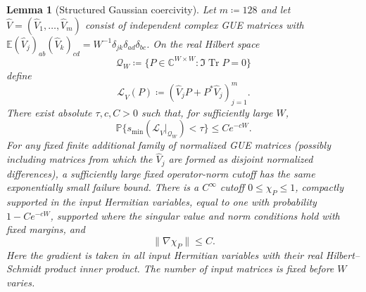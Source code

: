 \documentclass[11pt]{article}
\numberwithin{equation}{section}
\newtheorem{lemma}[theorem]{Lemma}
\theoremstyle{remark}
\newcommand{\E}{\mathbb E}
\newcommand{\Prob}{\mathbb P}
\newcommand{\Tr}{\operatorname{Tr}}
\begin{document}
\begin{lemma}[Structured Gaussian coercivity]\label{lem:c-gaussian}
Let \(m\coloneqq 128\) and let \(\widehat V=(\widehat V_1,\ldots,\widehat V_m)\) consist of independent complex GUE
matrices with
\(\E(\widehat V_j)_{ab}(\widehat V_k)_{cd}
  =W^{-1}\delta_{jk}\delta_{ad}\delta_{bc}\).
On the real Hilbert space
\[
 \mathcal Q_W\coloneqq \{P\in\mathbb C^{W\times W}:\Im\Tr P=0\}
\]
define
\begin{equation}
 \mathcal L_{\widehat V}(P)\coloneqq (\widehat V_jP+P^*\widehat V_j)_{j=1}^{m}.
 \label{cg:eq:LG}
\end{equation}
There exist absolute \(\tau,c,C>0\) such that, for sufficiently large \(W\),
\begin{equation}
 \Prob\{s_{\min}(\mathcal L_{\widehat V}|_{\mathcal Q_W})<\tau\}\le Ce^{-cW}.
 \label{cg:eq:SG}
\end{equation}
For any fixed finite additional family of normalized GUE matrices
(possibly including matrices from which the \(\widehat V_j\) are formed as disjoint normalized
differences), a sufficiently large fixed operator-norm cutoff has the
same exponentially small failure bound. There is a \(C^\infty\) cutoff
\(0\le\chi_P\le1\), compactly supported in the input Hermitian variables,
equal to one with probability \(1-Ce^{-cW}\), supported where the
singular value and norm conditions hold with fixed margins, and
\begin{equation}
 \|\nabla\chi_P\|\le C .
 \label{cg:eq:cutoff}
\end{equation}
Here the gradient is taken in all input Hermitian variables with
their real Hilbert--Schmidt product inner product.
The number of input matrices is fixed before \(W\) varies.

\end{lemma}
\end{document}
